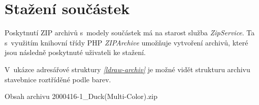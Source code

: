 \section{Stažení součástek}
Poskytnutí ZIP archivů s~modely součástek má na starost služba \textit{ZipService}. Ta s~využitím knihovní třídy PHP \textit{ZIPArchive} umožňuje vytvoření archivů, které jsou následně poskytnuté uživateli ke stažení. 

V~ukázce adresářové struktury \emph{\ref{ldraw-archiv}} je možné vidět strukturu archivu stavebnice roztříděné podle barev.

\begin{dirfigure}%
    \caption{Obsah archivu 2000416-1\_Duck(Multi-Color).zip}\label{ldraw-archiv}
\end{dirfigure}